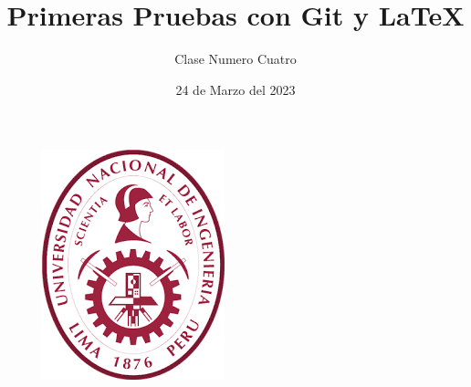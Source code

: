\documentclass{article}
\title{Primeras Pruebas con Git y \LaTeX}
\author{Clase Numero Cuatro}
\date{24 de Marzo del 2023}
\begin{document}
\maketitle
\lipsum[12-18]

\begin{figure}[h]
\centering
\includegraphics{LogoUNI.png}
\end{figure}
\end{document}
